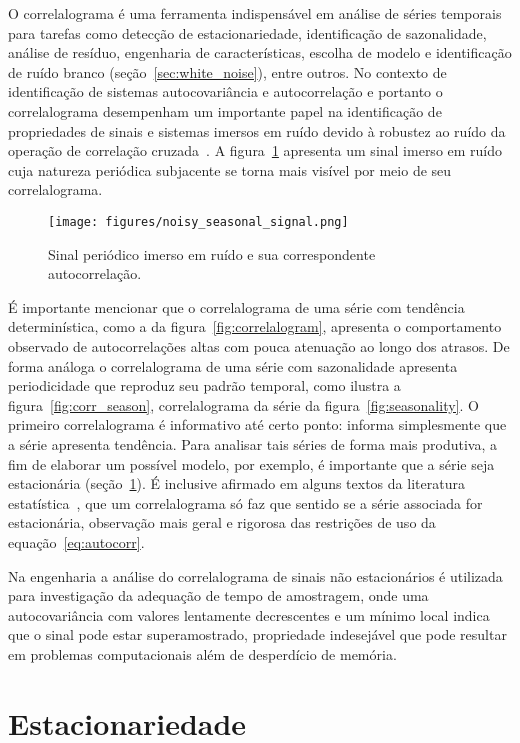 O correlalograma é uma ferramenta indispensável em análise de séries temporais
para tarefas como detecção de estacionariedade, identificação de sazonalidade,
análise de resíduo, engenharia de características, escolha de modelo e
identificação de ruído branco (seção~\ref{sec:white_noise}), entre outros. No
contexto de identificação de sistemas autocovariância e autocorrelação e
portanto o correlalograma desempenham um importante papel na identificação de
propriedades de sinais e sistemas imersos em ruído devido à robustez ao ruído
da operação de correlação cruzada~\cite{aguirre}. A figura~\ref{fig:noisy_sine}
apresenta um sinal imerso em ruído cuja natureza periódica subjacente se torna
mais visível por meio de seu correlalograma.

\begin{figure}
    \centering
    \texttt{[image: figures/noisy\_seasonal\_signal.png]}
    \caption{Sinal periódico imerso em ruído e sua correspondente autocorrelação.}
    \label{fig:noisy_sine}
\end{figure}

É importante mencionar que o correlalograma de uma série com tendência
determinística, como a da figura~\ref{fig:correlalogram}, apresenta o
comportamento observado de autocorrelações altas com pouca atenuação ao longo
dos atrasos. De forma análoga o correlalograma de uma série com sazonalidade
apresenta periodicidade que reproduz seu padrão temporal, como ilustra a
figura~\ref{fig:corr_season}, correlalograma da série da
figura~\ref{fig:seasonality}. O primeiro correlalograma é informativo até
certo ponto: informa simplesmente que a série apresenta tendência. Para
analisar tais séries de forma mais produtiva, a fim de elaborar um possível
modelo, por exemplo, é importante que a série seja estacionária
(seção~\ref{sec:stationarity}). É inclusive afirmado em alguns textos da
literatura estatística~\cite{chatfield}, que um correlalograma só faz que
sentido se a série associada for estacionária, observação mais geral e rigorosa
das restrições de uso da equação~\ref{eq:autocorr}.

Na engenharia a análise do correlalograma de sinais não estacionários é
utilizada para investigação da adequação de tempo de amostragem, onde uma
autocovariância com valores lentamente decrescentes e um mínimo local indica que
o sinal pode estar superamostrado, propriedade indesejável que pode resultar em
problemas computacionais além de desperdício de memória.

\section{Estacionariedade}\label{sec:stationarity}

